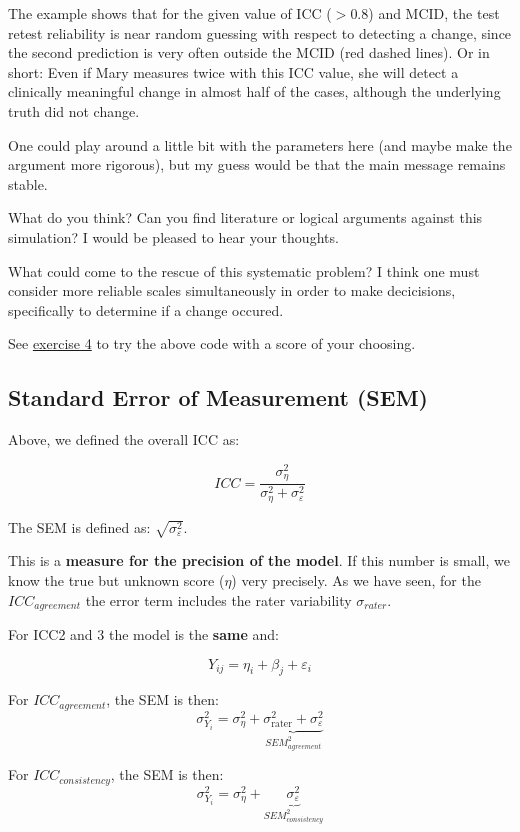 \documentclass[
]{book}
\begin{document}
The example shows that for the given value of ICC (\(>0.8\)) and MCID, the test retest reliability
is near random guessing with respect to detecting a change, since the second prediction is
very often outside the MCID (red dashed lines). Or in short: Even if Mary measures twice
with this ICC value, she will detect a clinically meaningful change in almost half of the cases,
although the underlying
truth did not change.

One could play around a little bit with the parameters here
(and maybe make the argument more rigorous),
but my guess would be that the main message remains stable.

What do you think? Can you find literature or logical arguments against this
simulation? I would be pleased to hear your thoughts.

What could come to the rescue of this systematic problem?
I think one must consider more reliable scales simultaneously in order
to make decicisions, specifically to determine if a change occured.

See \hyperref[exercise4]{exercise 4} to try the above code with a score of your choosing.

\subsection{Standard Error of Measurement (SEM)}\label{standard-error-of-measurement-sem}

Above, we defined the overall ICC as:

\[ICC = \frac{\sigma_{\eta}^2}{\sigma_{\eta}^2 + \sigma_{\varepsilon}^2}\]

The SEM is defined as: \(\sqrt{\sigma_{\varepsilon}^2}\).

This is a \textbf{measure for the precision of the model}. If this number is small,
we know the true but unknown score (\(\eta\)) very precisely. As we have seen, for the
\(ICC_{agreement}\) the error term includes the rater variability \(\sigma_{rater}\).

For ICC2 and 3 the model is the \textbf{same} and:

\[Y_{ij} = \eta_i + \beta_j + \varepsilon_i\]

For \(ICC_{agreement}\), the SEM is then:
\[\sigma_{Y_i}^2 = \sigma_{\eta}^2 + \underbrace{\sigma_{\text{rater}}^2 + \sigma_{\varepsilon}^2}_{SEM_{agreement}^2}\]

For \(ICC_{consistency}\), the SEM is then:
\[\sigma_{Y_i}^2 = \sigma_{\eta}^2 + \underbrace{\sigma_{\varepsilon}^2}_{SEM_{consistency}^2}\]
\end{document}
